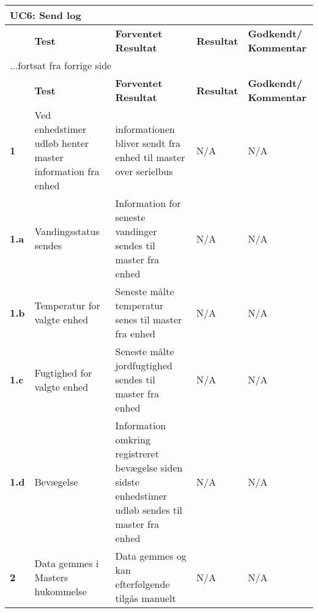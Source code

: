 
\begin{center}
\begin{longtable}{|p{}|p{}|p{}|p{}|p{}|} %
\hline
\multicolumn{5}{|l|}{\textbf{UC6: Send log}} \\ \hline
\multicolumn{1}{|c|}{} &
\textbf{Test} &
\textbf{Forventet \newline Resultat} &
\textbf{Resultat} &
\textbf{Godkendt/ \newline Kommentar} \\ \hline 
\endfirsthead

\multicolumn{5}{l}{...fortsat fra forrige side} \\ \hline 
\multicolumn{1}{|c|}{} &
\textbf{Test} &
\textbf{Forventet \newline Resultat} &
\textbf{Resultat} &
\textbf{Godkendt/ \newline Kommentar} \\ \hline 
\endhead

\textbf{1}	&Ved enhedstimer udløb henter master information fra enhed
			&informationen bliver sendt fra enhed til master over serielbus
			&N/A
			&N/A \\ \hline 
			
\textbf{1.a}	&Vandingsstatus sendes
			&Information for seneste vandinger sendes til master fra enhed
			&N/A
			&N/A \\ \hline 
			
\textbf{1.b}	&Temperatur for valgte enhed
			&Seneste målte temperatur senes til master fra enhed
			&N/A
			&N/A \\ \hline 
			
\textbf{1.c}	&Fugtighed for valgte enhed
			&Seneste målte jordfugtighed sendes til master fra enhed
			&N/A
			&N/A \\ \hline 
			
\textbf{1.d}	&Bevægelse
			&Information omkring registreret bevægelse siden sidste enhedstimer udløb sendes til master fra enhed
			&N/A
			&N/A \\ \hline 
			
\textbf{2}	&Data gemmes i Masters hukommelse
			&Data gemmes og kan efterfølgende tilgås manuelt
			&N/A
			&N/A \\ \hline 
			
\end{longtable}
	\label{ATUC6} 
\end{center}
